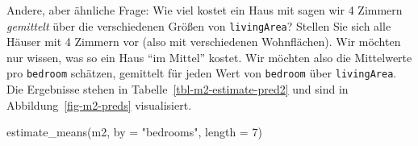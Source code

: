 \documentclass[
  ngerman,
  letterpaper,
  twoside,
  open=any]{scrbook}
\newenvironment{Shaded}{\begin{snugshade}}{\end{snugshade}}
\newcommand{\AttributeTok}[1]{\textcolor[rgb]{0.40,0.45,0.13}{#1}}
\newcommand{\DecValTok}[1]{\textcolor[rgb]{0.68,0.00,0.00}{#1}}
\newcommand{\FunctionTok}[1]{\textcolor[rgb]{0.28,0.35,0.67}{#1}}
\newcommand{\NormalTok}[1]{\textcolor[rgb]{0.00,0.23,0.31}{#1}}
\newcommand{\StringTok}[1]{\textcolor[rgb]{0.13,0.47,0.30}{#1}}
\theoremstyle{definition}
\theoremstyle{plain}
\theoremstyle{definition}
\theoremstyle{definition}
\theoremstyle{definition}
\theoremstyle{definition}
\theoremstyle{remark}
\begin{document}
Andere, aber ähnliche Frage: Wie viel kostet ein Haus mit sagen wir 4
Zimmern \emph{gemittelt} über die verschiedenen Größen von
\texttt{livingArea}? Stellen Sie sich alle Häuser mit 4 Zimmern vor
(also mit verschiedenen Wohnflächen). Wir möchten nur wissen, was so ein
Haus \enquote{im Mittel} kostet. Wir möchten also die Mittelwerte pro
\texttt{bedroom} schätzen, gemittelt für jeden Wert von \texttt{bedroom}
über \texttt{livingArea}. Die Ergebnisse stehen in
Tabelle~\ref{tbl-m2-estimate-pred2} und sind in
Abbildung~\ref{fig-m2-preds} visualisiert.

\begin{Shaded}
\begin{Highlighting}[]
\FunctionTok{estimate\_means}\NormalTok{(m2, }\AttributeTok{by =} \StringTok{"bedrooms"}\NormalTok{, }\AttributeTok{length =} \DecValTok{7}\NormalTok{)}
\end{Highlighting}
\end{Shaded}
\end{document}
